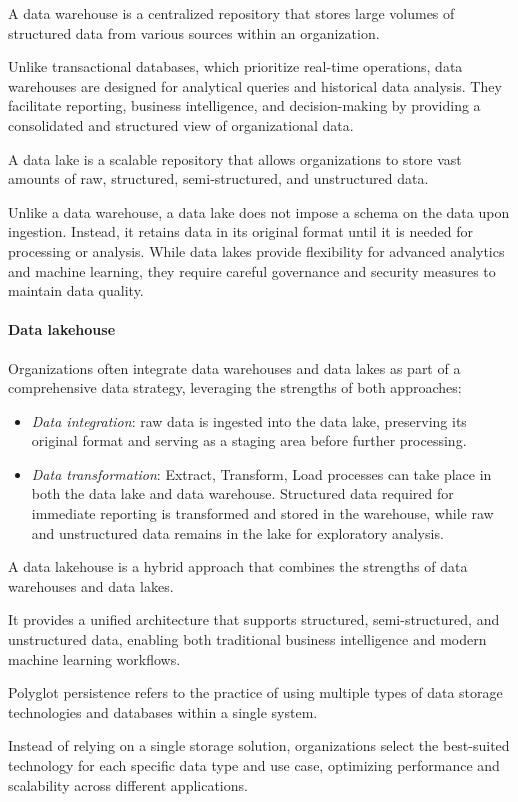 \begin{definition}
    A data warehouse is a centralized repository that stores large volumes of structured data from various sources within an organization.
\end{definition}
\noindent Unlike transactional databases, which prioritize real-time operations, data warehouses are designed for analytical queries and historical data analysis. 
They facilitate reporting, business intelligence, and decision-making by providing a consolidated and structured view of organizational data.
\begin{definition}
    A data lake is a scalable repository that allows organizations to store vast amounts of raw, structured, semi-structured, and unstructured data.
\end{definition}
\noindent Unlike a data warehouse, a data lake does not impose a schema on the data upon ingestion. 
Instead, it retains data in its original format until it is needed for processing or analysis.
While data lakes provide flexibility for advanced analytics and machine learning, they require careful governance and security measures to maintain data quality.

\paragraph*{Data lakehouse}
Organizations often integrate data warehouses and data lakes as part of a comprehensive data strategy, leveraging the strengths of both approaches:
\begin{itemize}
    \item \textit{Data integration}: raw data is ingested into the data lake, preserving its original format and serving as a staging area before further processing.
    \item \textit{Data transformation}: Extract, Transform, Load processes can take place in both the data lake and data warehouse. 
        Structured data required for immediate reporting is transformed and stored in the warehouse, while raw and unstructured data remains in the lake for exploratory analysis.
\end{itemize}
\begin{definition}
    A data lakehouse is a hybrid approach that combines the strengths of data warehouses and data lakes.
\end{definition}
\noindent It provides a unified architecture that supports structured, semi-structured, and unstructured data, enabling both traditional business intelligence and modern machine learning workflows.
\begin{definition}
    Polyglot persistence refers to the practice of using multiple types of data storage technologies and databases within a single system. 
\end{definition}
\noindent Instead of relying on a single storage solution, organizations select the best-suited technology for each specific data type and use case, optimizing performance and scalability across different applications.

